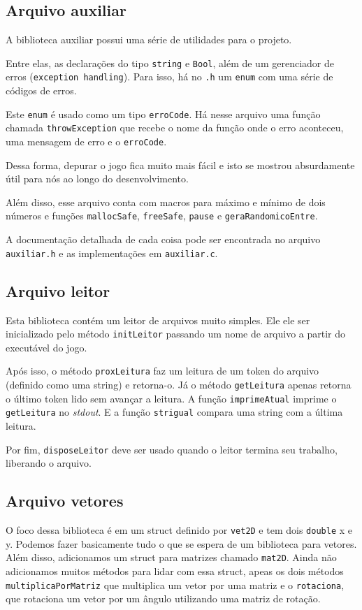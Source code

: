 \documentclass[12pt, a4paper]{article}
\begin{document}
    \subsection{Arquivo auxiliar}
        A biblioteca auxiliar possui uma série de utilidades para o projeto.

        Entre elas, as declarações do tipo \texttt{string} e \texttt{Bool}, além de
        um gerenciador de erros (\texttt{exception handling}). Para isso, 
        há no \texttt{.h} um \texttt{enum} com uma série de códigos de erros.

        Este \texttt{enum} é usado como um tipo \texttt{erroCode}. Há nesse arquivo
        uma função chamada \texttt{throwException} que recebe o nome da função 
        onde o erro aconteceu, uma mensagem de erro e o \texttt{erroCode}.

        Dessa forma, depurar o jogo fica muito mais fácil e isto se mostrou
        absurdamente útil para nós ao longo do desenvolvimento.

        Além disso, esse arquivo conta com macros para máximo e mínimo de dois números e funções
        \texttt{mallocSafe}, \texttt{freeSafe}, \texttt{pause} e \texttt{geraRandomicoEntre}.

        A documentação detalhada de cada coisa pode ser encontrada no arquivo 
        \texttt{auxiliar.h} e as implementações em \texttt{auxiliar.c}.

    \subsection{Arquivo leitor}
        Esta biblioteca contém um leitor de arquivos muito simples. Ele ele
        ser inicializado pelo método \texttt{initLeitor} passando um
        nome de arquivo a partir do executável do jogo.

        Após isso, o método \texttt{proxLeitura} faz um leitura de um token
        do arquivo (definido como uma string) e retorna-o. Já o método
        \texttt{getLeitura} apenas retorna o último token lido sem avançar
        a leitura.
        A função \texttt{imprimeAtual} imprime o \texttt{getLeitura} no
        \textit{stdout}. E a função \texttt{strigual} compara uma string 
        com a última leitura.

        Por fim, \texttt{disposeLeitor} deve ser usado quando o leitor termina 
        seu trabalho, liberando o arquivo.

    \subsection{Arquivo vetores}
        O foco dessa biblioteca é em um struct definido por \texttt{vet2D} e tem
        dois \texttt{double} x e y. Podemos fazer basicamente tudo o que se espera
        de um biblioteca para vetores. Além disso, adicionamos um struct
        para matrizes chamado \texttt{mat2D}. Ainda não adicionamos muitos métodos
        para lidar com essa struct, apeas os dois métodos \texttt{multiplicaPorMatriz}
        que multiplica um vetor por uma matriz e o \texttt{rotaciona},
        que rotaciona um vetor por um ângulo utilizando uma matriz de rotação.
\end{document}
